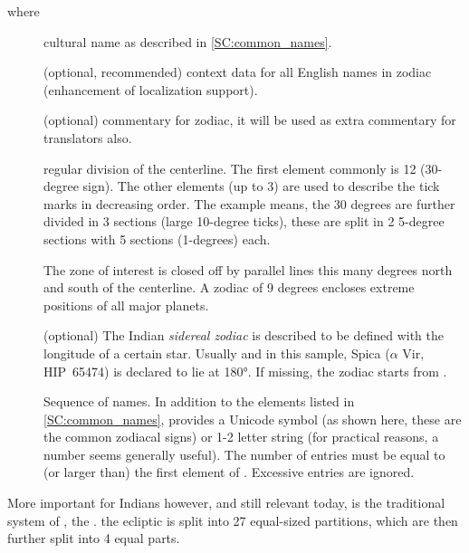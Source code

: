 where 
\begin{description}
\item[] cultural name as described in \ref{SC:common_names}.
\item[] (optional, recommended) context data for all English names in zodiac (enhancement of localization support).
\item[] (optional) commentary for zodiac, it will be used as extra commentary for translators also.
\item[] regular division of the centerline. The first element commonly is 12 (30-degree sign). 
The other elements (up to 3) are used to describe the tick marks in decreasing order. The example means, 
the 30 degrees are further divided in 3 sections (large 10-degree ticks), these are split in 2 5-degree sections with 5 sections (1-degrees) each.
\item[] The zone of interest is closed off by parallel lines this many degrees north and south of the centerline. 
A zodiac of 9 degrees encloses extreme positions of all major planets. 
\item[] (optional) The Indian \emph{sidereal zodiac} is described to be defined with the longitude of a certain star. 
Usually and in this sample, Spica ($\alpha$ Vir, HIP~65474) is declared to lie at 180°.  If missing, the zodiac starts from \Aries. 
\item[] Sequence of names. In addition to the elements listed in \ref{SC:common_names},  provides a Unicode symbol 
(as shown here, these are the common zodiacal signs) or 1-2 letter string (for practical reasons, a number seems generally useful). 
The number of entries must be equal to (or larger than) the first element of . Excessive entries are ignored. 
\end{description}


\noindent More important for Indians however, and still relevant today, is the traditional system of , the . 
the ecliptic is split into 27 equal-sized partitions, which are then further split into 4 equal parts.


